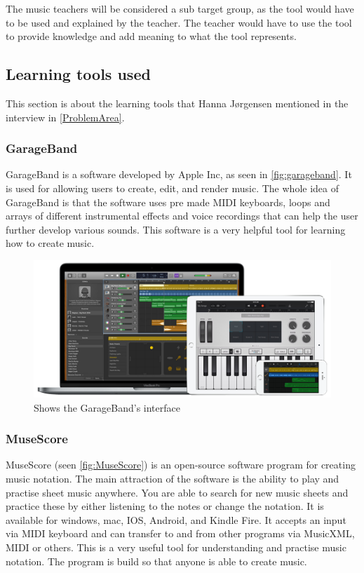The music teachers will be considered a sub target group, as the tool would have to be used and explained by the teacher. The teacher would have to use the tool to provide knowledge and add meaning to what the tool represents.
 
\subsection{Learning tools used}%
This section is about the learning tools that Hanna Jørgensen mentioned in the interview in \autoref{ProblemArea}.  

\subsubsection{GarageBand}
GarageBand is a software developed by Apple Inc, as seen in \autoref{fig:garageband}. It is used for allowing users to create, edit, and render music. The whole idea of GarageBand is that the software uses pre made MIDI keyboards, loops and arrays of different instrumental effects and voice recordings that can help the user further develop various sounds. This software is a very helpful tool for learning how to create music.
\begin{figure}[H]
	\centering
	\includegraphics[width=0.7\linewidth]{figure/Analysis/garageband}
	
	\caption{Shows the GarageBand's interface}
	\label{fig:garageband}
\end{figure}


\subsubsection{MuseScore}
MuseScore (seen \autoref{fig:MuseScore}) is an open-source software program for creating music notation. The main attraction of the software is the ability to play and practise sheet music anywhere. You are able to search for new music sheets and practice these by either listening to the notes or change the notation. It is available for windows, mac, IOS, Android, and Kindle Fire. It accepts an input via MIDI keyboard and can transfer to and from other programs via MusicXML, MIDI or others. This is a very useful tool for understanding and practise music notation. The program is build so that anyone is able to create music.

